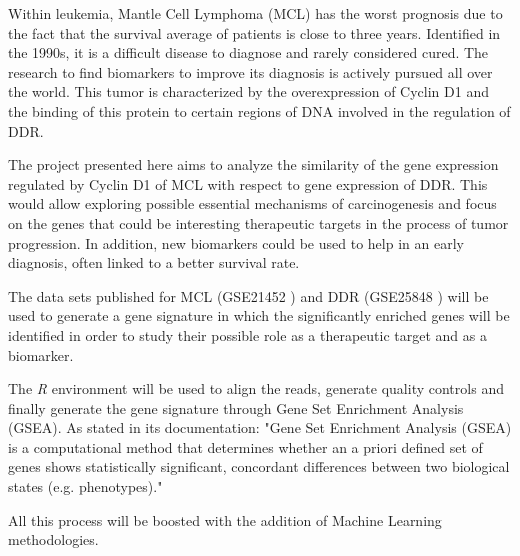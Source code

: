 Within leukemia, Mantle Cell Lymphoma (MCL) has the worst prognosis due to the fact that the survival average of patients is close to three years. Identified in the 1990s, it is a difficult disease to diagnose and rarely considered cured. The research to find biomarkers to improve its diagnosis is actively pursued all over the world. This tumor is characterized by the overexpression of Cyclin D1 and the binding of this protein to certain regions of DNA involved in the regulation of DDR.

The project presented here aims to analyze the similarity of the gene expression regulated by Cyclin D1 of MCL with respect to gene expression of DDR. This would allow exploring possible essential mechanisms of carcinogenesis and focus on the genes that could be interesting therapeutic targets in the process of tumor progression. In addition, new biomarkers could be used to help in an early diagnosis, often linked to a better survival rate.

The data sets published for MCL (GSE21452 \cite{mclData:2011}) and DDR (GSE25848 \cite{ddrData:2011}) will be used to generate a gene signature in which the significantly enriched genes will be identified in order to study their possible role as a therapeutic target and as a biomarker.

The \textit{R} environment will be used to align the reads, generate quality controls and finally generate the gene signature through Gene Set Enrichment Analysis (GSEA). 
As stated in its documentation:
"Gene Set Enrichment Analysis (GSEA) is a computational method that determines whether an a priori defined set of genes shows statistically significant, concordant differences between two biological states (e.g. phenotypes)."\cite{gsea_user_doc:2012}


All this process will be boosted with the addition of Machine Learning methodologies.

\vspace{1.5cm}